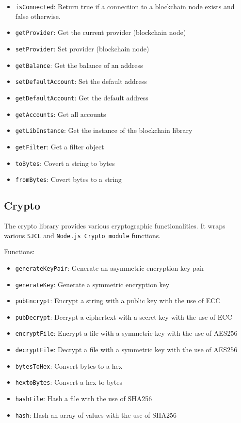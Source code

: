 \begin{itemize}
  \item \verb|isConnected|: Return true if a connection to a blockchain node exists and false otherwise.
  \item \verb|getProvider|: Get the current provider (blockchain node)
  \item \verb|setProvider|: Set provider (blockchain node)
  \item \verb|getBalance|: Get the balance of an address
  \item \verb|setDefaultAccount|: Set the default address
  \item \verb|getDefaultAccount|: Get the default address
  \item \verb|getAccounts|: Get all accounts
  \item \verb|getLibInstance|: Get the instance of the blockchain library
  \item \verb|getFilter|: Get a filter object
  \item \verb|toBytes|: Covert a string to bytes
  \item \verb|fromBytes|: Covert bytes to a string
\end{itemize}

\subsection{Crypto}
\label{implemenation:libs:cr}

The crypto library provides various cryptographic functionalities. It wraps various \verb|SJCL| and \verb|Node.js Crypto module| functions.

Functions:

\begin{itemize}
  \item \verb|generateKeyPair|: Generate an asymmetric encryption key pair
  \item \verb|generateKey|: Generate a symmetric encryption key
  \item \verb|pubEncrypt|: Encrypt a string with a public key with the use of ECC
  \item \verb|pubDecrypt|: Decrypt a ciphertext with a secret key with the use of ECC
  \item \verb|encryptFile|: Encrypt a file with a symmetric key with the use of AES256
  \item \verb|decryptFile|: Decrypt a file with a symmetric key with the use of AES256
  \item \verb|bytesToHex|: Convert bytes to a hex
  \item \verb|hextoBytes|: Convert a hex to bytes
  \item \verb|hashFile|: Hash a file with the use of SHA256
  \item \verb|hash|: Hash an array of values with the use of SHA256
\end{itemize}

